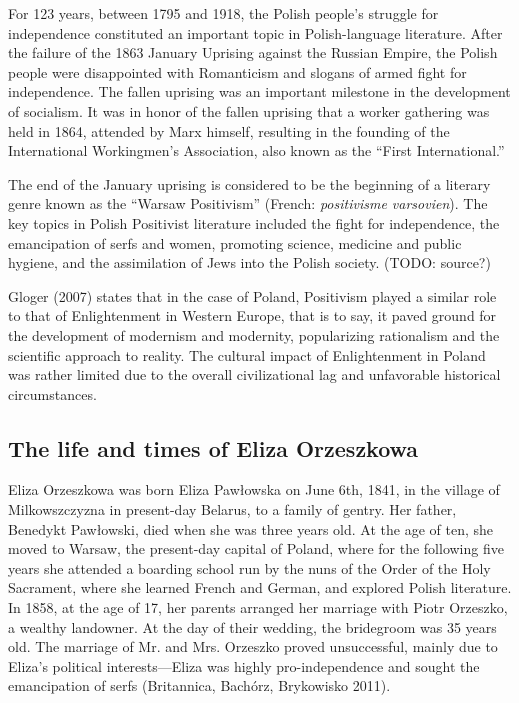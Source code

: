 For 123 years, between 1795 and 1918, the Polish people's struggle for independence constituted an important topic in Polish-language literature.
After the failure of the 1863 January Uprising against the Russian Empire, the Polish people were disappointed with Romanticism and slogans of armed fight for independence.
The fallen uprising was an important milestone in the development of socialism.
It was in honor of the fallen uprising that a worker gathering was held in 1864, attended by Marx himself, resulting in the founding of the International Workingmen's Association, also known as the ``First International.''

The end of the January uprising is considered to be the beginning of a literary genre known as the ``Warsaw Positivism'' (French: \textit{positivisme varsovien}).
The key topics in Polish Positivist literature included the fight for independence, the emancipation of serfs and women, promoting science, medicine and public hygiene, and the assimilation of Jews into the Polish society.
(TODO: source?)

Gloger (2007) states that in the case of Poland, Positivism played a similar role to that of Enlightenment in Western Europe, that is to say, it paved ground for the development of modernism and modernity, popularizing rationalism and the scientific approach to reality. The cultural impact of Enlightenment in Poland was rather limited due to the overall civilizational lag and unfavorable historical circumstances.

\subsection{The life and times of Eliza Orzeszkowa}

Eliza Orzeszkowa was born Eliza Pawłowska on June 6th, 1841, in the village of Milkowszczyzna in present-day Belarus, to a family of gentry. Her father, Benedykt Pawłowski, died when she was three years old. 
At the age of ten, she moved to Warsaw, the present-day capital of Poland, where for the following five years she attended a boarding school run by the nuns of the Order of the Holy Sacrament, where she learned French and German, and explored Polish literature.
In 1858, at the age of 17, her parents arranged her marriage with Piotr Orzeszko, a wealthy landowner.
At the day of their wedding, the bridegroom was 35 years old.
The marriage of Mr. and Mrs. Orzeszko proved unsuccessful, mainly due to Eliza's political interests---Eliza was highly pro-independence and sought the emancipation of serfs (Britannica, Bachórz, Brykowisko 2011).

